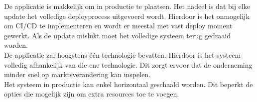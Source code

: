 De applicatie is makkelijk om in productie te plaatsen. Het nadeel is dat bij elke update het volledige deployprocess uitgevoerd wordt. Hierdoor is het onmogelijk om CI/CD te implementeren en wordt er meestal met vast deploy moment gewerkt. Als de update mislukt moet het volledige systeem terug gedraaid worden.\\
De applicatie zal hoogstens één technologie bevatten. Hierdoor is het systeem volledig afhankelijk van die ene technologie. Dit zorgt ervoor dat de onderneming minder snel op marktsverandering kan inspelen.\\
Het systeem in productie kan enkel horizontaal geschaald worden. Dit beperkt de opties die mogelijk zijn om extra resources toe te voegen. 
